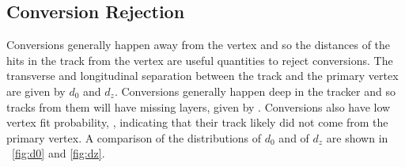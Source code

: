 \subsection{Conversion Rejection}

Conversions generally happen away from the vertex and so the distances of the
hits in the track from the vertex are useful quantities to reject conversions.
The transverse and longitudinal separation between the track and the primary
vertex are given by $d_{0}$ and $d_{z}$. Conversions generally happen deep in
the tracker and so tracks from them will have missing layers, given by \nmiss.
Conversions also have low vertex fit probability, \pvtx, indicating that their
track likely did not come from the primary vertex. A comparison of the
distributions of $d_{0}$ and of $d_{z}$ are shown in \FIGS~\ref{fig:d0} and
\ref{fig:dz}.

